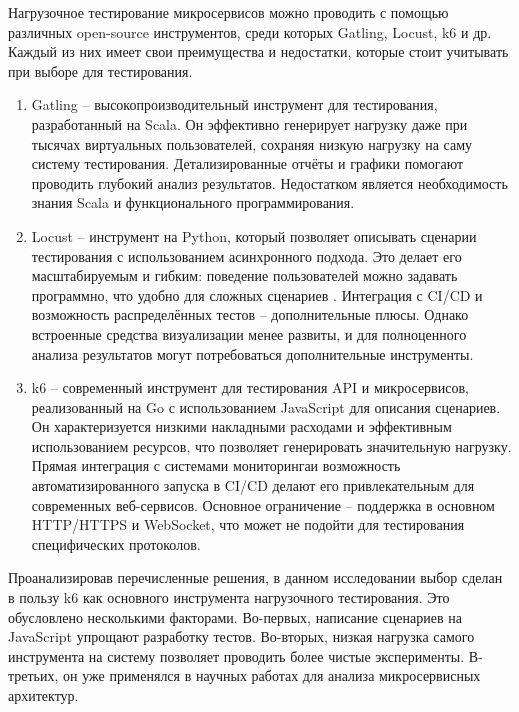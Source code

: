 Нагрузочное тестирование микросервисов можно проводить с помощью различных open-source инструментов, среди которых Gatling, Locust, k6 и др. Каждый из них имеет свои преимущества и недостатки, которые стоит учитывать при выборе для тестирования.
\begin{enumerate}
\item Gatling\cite{gatling} – высокопроизводительный инструмент для тестирования, разработанный на Scala. Он эффективно генерирует нагрузку даже при тысячах виртуальных пользователей, сохраняя низкую нагрузку на саму систему тестирования. Детализированные отчёты и графики помогают проводить глубокий анализ результатов. Недостатком является необходимость знания Scala и функционального программирования.

\item Locust \cite{locust} – инструмент на Python, который позволяет описывать сценарии тестирования с использованием асинхронного подхода. Это делает его масштабируемым и гибким: поведение пользователей можно задавать программно, что удобно для сложных сценариев \cite{allam2024synthetictimeseriesanomaly}. Интеграция с CI/CD и возможность распределённых тестов – дополнительные плюсы. Однако встроенные средства визуализации менее развиты, и для полноценного анализа результатов могут потребоваться дополнительные инструменты.

\item k6\cite{k6} – современный инструмент для тестирования API и микросервисов, реализованный на Go с использованием JavaScript для описания сценариев. Он характеризуется низкими накладными расходами и эффективным использованием ресурсов, что позволяет генерировать значительную нагрузку. Прямая интеграция с системами мониторингаи возможность автоматизированного запуска в CI/CD делают его привлекательным для современных веб-сервисов. Основное ограничение – поддержка в основном HTTP/HTTPS и WebSocket, что может не подойти для тестирования специфических протоколов.
\end{enumerate}
Проанализировав перечисленные решения, в данном исследовании выбор сделан в пользу k6 как основного инструмента нагрузочного тестирования. Это обусловлено несколькими факторами. Во-первых, написание сценариев на JavaScript упрощают разработку тестов. Во-вторых, низкая нагрузка самого инструмента на систему позволяет проводить более чистые эксперименты. В-третьих, он уже применялся в научных работах для анализа микросервисных архитектур. \cite{aqasizade2024kubernetesactionexploringperformance}

